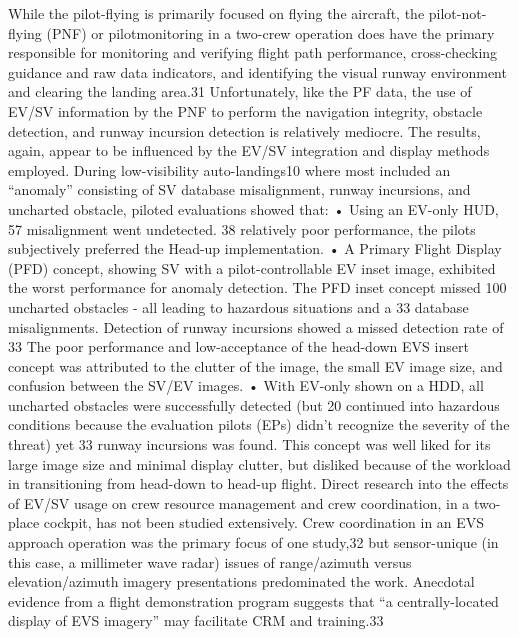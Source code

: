 \documentclass[utf8,bachelor,manualbib]{gradu3}
\begin{document}
While the pilot-flying is primarily focused on flying the aircraft, the pilot-not-flying (PNF) or pilotmonitoring
in a two-crew operation does have the primary responsible for monitoring and verifying flight path
performance, cross-checking guidance and raw data indicators, and identifying the visual runway environment
and clearing the landing area.31 Unfortunately, like the PF data, the use of EV/SV information by the PNF to
perform the navigation integrity, obstacle detection, and runway incursion detection is relatively mediocre.
The results, again, appear to be influenced by the EV/SV integration and display methods employed.
During low-visibility auto-landings10 where most included an “anomaly” consisting of SV database
misalignment, runway incursions, and uncharted obstacle, piloted evaluations showed that:
• Using an EV-only HUD, 57%
misalignment went undetected. 38%
relatively poor performance, the pilots subjectively preferred the Head-up implementation.
• A Primary Flight Display (PFD) concept, showing SV with a pilot-controllable EV inset image,
exhibited the worst performance for anomaly detection. The PFD inset concept missed 100%
uncharted obstacles - all leading to hazardous situations and a 33%
database misalignments. Detection of runway incursions showed a missed detection rate of 33%
The poor performance and low-acceptance of the head-down EVS insert concept was attributed to the
clutter of the image, the small EV image size, and confusion between the SV/EV images.
• With EV-only shown on a HDD, all uncharted obstacles were successfully detected (but 20%
continued into hazardous conditions because the evaluation pilots (EPs) didn’t recognize the severity
of the threat) yet 33%
runway incursions was found. This concept was well liked for its large image size and minimal
display clutter, but disliked because of the workload in transitioning from head-down to head-up
flight.
Direct research into the effects of EV/SV usage on crew resource management and crew coordination, in a
two-place cockpit, has not been studied extensively. Crew coordination in an EVS approach operation was
the primary focus of one study,32 but sensor-unique (in this case, a millimeter wave radar) issues of
range/azimuth versus elevation/azimuth imagery presentations predominated the work. Anecdotal evidence
from a flight demonstration program suggests that “a centrally-located display of EVS imagery” may facilitate
CRM and training.33 \citep{baileyym2007}
\end{document}
